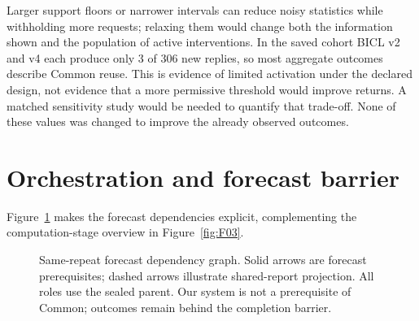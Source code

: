 Larger support floors or narrower intervals can reduce noisy statistics
while withholding more requests; relaxing them would change both the
information shown and the population of active interventions. In the
saved cohort BICL v2 and v4 each produce only 3 of 306 new replies, so most
aggregate outcomes describe Common reuse. This is evidence of limited
activation under the declared design, not evidence that a more permissive
threshold would improve returns. A matched sensitivity study would be
needed to quantify that trade-off. None of these values was changed to
improve the already observed outcomes.

\section{Orchestration and forecast barrier}\label{s:21530b5246fd89f6}
Figure~\ref{fig:dependency-review} makes the forecast dependencies
explicit, complementing the computation-stage overview in Figure~\ref{fig:F03}.
\begin{figure}[!t]\centering
{}
\caption[Same-repeat forecast dependency graph]{Same-repeat forecast dependency graph. Solid arrows are forecast prerequisites; dashed arrows illustrate shared-report projection. All roles use the sealed parent. Our system is not a prerequisite of Common; outcomes remain behind the completion barrier.}\label{fig:dependency-review}
\end{figure}
